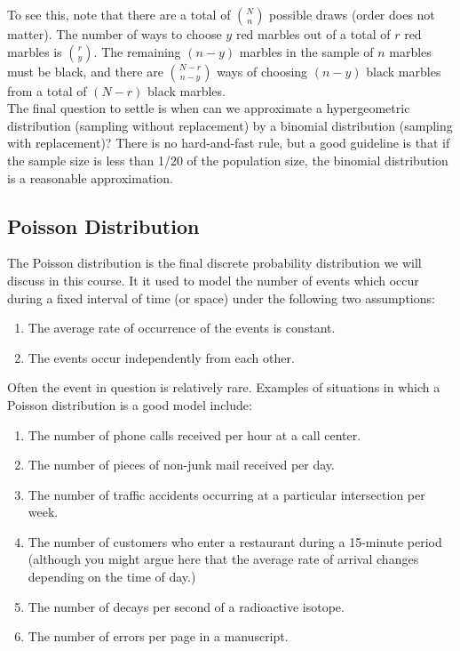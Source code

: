 \documentclass[12pt]{article}
\theoremstyle{definition}
\theoremstyle{remark}
\begin{document}
To see this, note that there are a total of $\binom{N}{n}$ possible draws (order does not matter). The number of ways to choose $y$ red marbles out of a total of $r$ red marbles is $\binom{r}{y}$. The remaining $(n - y)$ marbles in the sample of $n$ marbles must be black, and there are $\binom{N - r}{n - y}$ ways of choosing $(n - y)$ black marbles from a total of $(N - r)$ black marbles. \\

The final question to settle is when can we approximate a hypergeometric distribution (sampling without replacement) by a binomial distribution (sampling with replacement)? There is no hard-and-fast rule, but a good guideline is that if the sample size is less than 1/20 of the population size, the binomial distribution is a reasonable approximation. 

\subsection{Poisson Distribution}

The Poisson distribution is the final discrete probability distribution we will discuss in this course. It it used to model the number of events which occur during a fixed interval of time (or space) under the following two assumptions:
\begin{enumerate}
\item The average rate of occurrence of the events is constant.
\item The events occur independently from each other.
\end{enumerate}
Often the event in question is relatively rare. Examples of situations in which a Poisson distribution is a good model include:
\begin{enumerate}
\item The number of phone calls received per hour at a call center.
\item The number of pieces of non-junk mail received per day.
\item The number of traffic accidents occurring at a particular intersection per week.
\item The number of customers who enter a restaurant during a 15-minute period (although you might argue here that the average rate of arrival changes depending on the time of day.)
\item The number of decays per second of a radioactive isotope.
\item The number of errors per page in a manuscript.
\end{enumerate}
\end{document}

